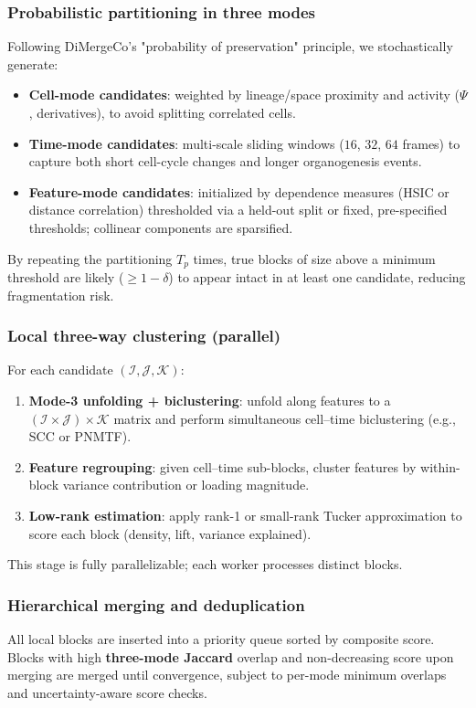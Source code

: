 \documentclass[unnumsec,webpdf,modern,large,namedate]{oup-authoring-template}%
\theoremstyle{thmstyleone}\newtheorem{theorem}{Theorem}
\theoremstyle{thmstyletwo}\newtheorem{example}{Example}
\theoremstyle{thmstylethree}\newtheorem{definition}{Definition}
\begin{document}
\subsubsection{Probabilistic partitioning in three modes}
Following DiMergeCo's "probability of preservation" principle, we stochastically generate:
\begin{itemize}
    \item \textbf{Cell-mode candidates}: weighted by lineage/space proximity and activity ($\Psi$, derivatives), to avoid splitting correlated cells.
    \item \textbf{Time-mode candidates}: multi-scale sliding windows ($16$, $32$, $64$ frames) to capture both short cell-cycle changes and longer organogenesis events.
    \item \textbf{Feature-mode candidates}: initialized by dependence measures (HSIC or distance correlation) thresholded via a held-out split or fixed, pre-specified thresholds; collinear components are sparsified.
\end{itemize}
By repeating the partitioning $T_p$ times, true blocks of size above a minimum threshold are likely ($\geq 1-\delta$) to appear intact in at least one candidate, reducing fragmentation risk.

\subsubsection{Local three-way clustering (parallel)}
For each candidate $(\mathcal{I},\mathcal{J},\mathcal{K})$:
\begin{enumerate}
    \item \textbf{Mode-3 unfolding + biclustering}: unfold along features to a $(\mathcal{I} \times \mathcal{J}) \times \mathcal{K}$ matrix and perform simultaneous cell--time biclustering (e.g., SCC or PNMTF).
    \item \textbf{Feature regrouping}: given cell--time sub-blocks, cluster features by within-block variance contribution or loading magnitude.
    \item \textbf{Low-rank estimation}: apply rank-1 or small-rank Tucker approximation to score each block (density, lift, variance explained).
\end{enumerate}
This stage is fully parallelizable; each worker processes distinct blocks.

\subsubsection{Hierarchical merging and deduplication}
All local blocks are inserted into a priority queue sorted by composite score. Blocks with high \textbf{three-mode Jaccard} overlap and non-decreasing score upon merging are merged until convergence, subject to per-mode minimum overlaps and uncertainty-aware score checks.
\end{document}
